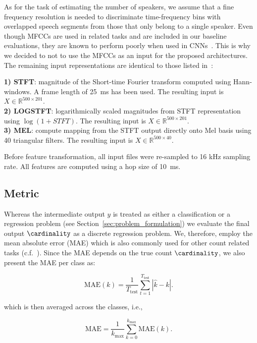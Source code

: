 As for the task of estimating the number of speakers, we assume that a fine frequency resolution is needed to discriminate time-frequency bins with overlapped speech segments from those that only belong to a single speaker.
Even though MFCCs are used in related tasks and are included in our baseline evaluations, they are known to perform poorly when used in CNNs~\cite{Seltzer13}.
This is why we decided to not to use the MFCCs as an input for the proposed architectures.
The remaining input representations are identical to those listed in~\cite{stoeter17}:

\noindent\textbf{1) STFT}: magnitude of the Short-time Fourier transform computed using Hann-windows.
A frame length of 25~ms has been used.
The resulting input is \(X \in \mathbb{R}^{500 \times 201}\).\\
\textbf{2) LOGSTFT}: logarithmically scaled magnitudes from STFT representation using \(\log(1 + STFT)\).
The resulting input is \(X \in \mathbb{R}^{500 \times 201}\).\\
\textbf{3) MEL}: compute mapping from the STFT output directly onto Mel basis using 40 triangular filters.
The resulting input is \(X \in \mathbb{R}^{500 \times 40}\).
\par
Before feature transformation, all input files were re-sampled to 16 kHz sampling rate. All features are computed using a hop size of 10~ms.

\subsection{Metric}%
\label{ssec:metrics}

Whereas the intermediate output \(y\) is treated as either a classification or a regression problem (see Section~\ref{sec:problem_formulation}) we evaluate the final output \(\cardinality \) as a discrete regression problem.
We, therefore, employ the mean absolute error (MAE) which is also commonly used for other count related tasks (c.f.~\cite{zhang15, Rezatofigh16}).
Since the MAE depends on the true count \(\cardinality \), we also present the MAE per class as:

\begin{equation}
  \mbox{MAE}(k) = \frac{1}{T_{\textrm{test}}} \sum_{t=1}^{T_\textrm{test}}\left| \hat{k} - k \right|.
\end{equation}

which is then averaged across the classes, i.e.,

\begin{equation}
  \mbox{MAE} = \frac{1}{k_{\max}} \sum_{k=0}^{k_{\max}} \mbox{MAE}(k).
\end{equation}

